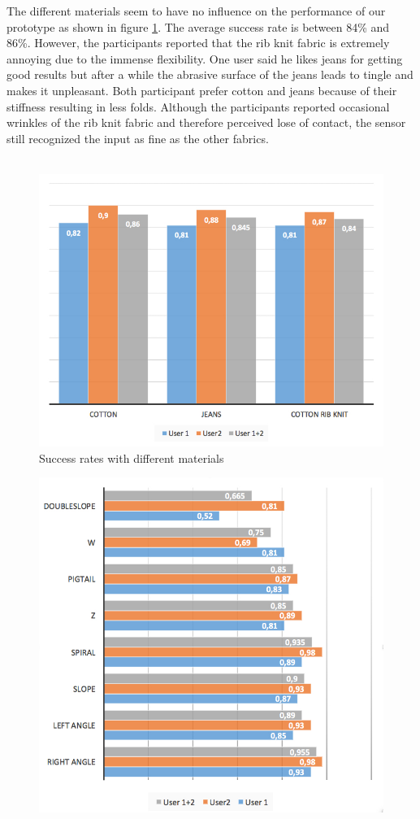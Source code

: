 The different materials seem to have no influence on the performance of our prototype as shown in figure \ref{fig:materials}. The average success rate is between 84\% and 86\%. However, the participants reported that the rib knit fabric is extremely annoying due to the immense flexibility. One user said he likes jeans for getting good results but after a while the abrasive surface of the jeans leads to tingle and makes it unpleasant. Both participant prefer cotton and jeans because of their stiffness resulting in less folds. Although the participants reported occasional wrinkles of the rib knit fabric and therefore perceived lose of contact, the sensor still recognized the input as fine as the other fabrics. 
\\ \\
\begin{center}
\begin{figure}
\includegraphics[scale=0.4]{images/materials.jpg}
\caption{Success rates with different materials}
\label{fig:materials}
\end{figure}
\begin{figure}
\includegraphics[scale=0.4]{images/gestures.jpg}

\end{figure}
\end{center}
